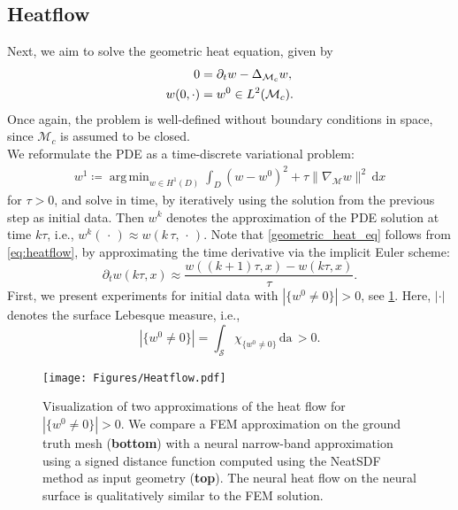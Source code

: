\documentclass[12pt,openany]{book}
\theoremstyle{plainnormal}
\theoremstyle{remark}
\DeclareMathOperator*{\argmin}{arg\,min}
\begin{document}
\subsection{Heatflow}\label{section_heatflow}
Next, we aim to solve the geometric heat equation, given by
\begin{align}\label{eq:heatflow}
    0 &= \partial_t w - \Delta_{\mathcal{M}_c} w,\notag \\
    w(0,\cdot) &= w^0 \in L^2(\mathcal{M}_c).  
\end{align}
Once again, the problem is well-defined without boundary conditions in space, since $\mathcal{M}_c$ is assumed to be closed.\\
We reformulate the PDE as a time-discrete variational problem:
\begin{align}\label{geometric_heat_eq}
    w^{1} \coloneqq \argmin_{w\in H^1(D)}\int_D (w - w^0)^2 + \tau \|\nabla_{\mathcal{M}}w\|^2 \,\mathrm{d}x
\end{align} for $\tau > 0 $, and solve in time, by iteratively using the solution from the previous step as initial data. Then $w^k$ denotes the approximation of the PDE solution at time $k\tau$, i.e., $w^k(\,\cdot\,) \approx w(k\,\tau, \,\cdot\,)$. Note that \cref{geometric_heat_eq} follows from \cref{eq:heatflow}, by approximating the time derivative via the implicit Euler scheme:  $$\partial_t w(k\tau, x) \approx \frac{w((k+1)\tau, x) - w(k\tau, x)}{\tau}. $$
First, we present experiments for initial data with $|\{w^0 \neq0\}| >0$, see \cref{comp_beethoven}. Here, $|\cdot|$ denotes the surface Lebesque measure, i.e., $$|\{w^0 \neq0\}| = \int_\mathcal{S} \chi_{\{w^0 \neq 0\}} \,\mathrm{da}\, {>} 0.$$
\begin{figure}
    \centering    
    \texttt{[image: Figures/Heatflow.pdf]}
\caption{Visualization of two approximations of the heat flow for $|\{w^0 \neq0\}| >0$. We compare a FEM approximation on the ground truth mesh (\textbf{bottom}) with a neural narrow-band approximation using a signed distance function computed using the NeatSDF method as input geometry (\textbf{top}). The neural heat flow on the neural surface is qualitatively similar to the FEM solution.}\label{comp_beethoven}
\end{figure}
\end{document}
